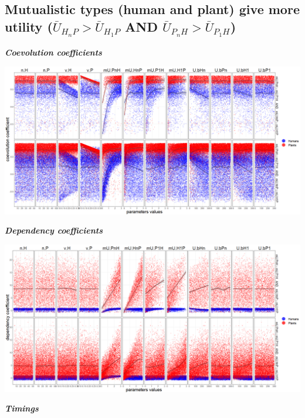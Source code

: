 \documentclass[]{book}
\begin{document}
\hypertarget{mutualistic-types-human-and-plant-give-more-utility-baru_h_np-baru_h_1p-and-baru_p_nh-baru_p_1h}{%
\subsection{\texorpdfstring{Mutualistic types (human and plant) give more utility (\(\bar{U}_{H_{n}P}> \bar{U}_{H_{1}P}\) AND \(\bar{U}_{P_{n}H}> \bar{U}_{P_{1}H}\))}{Mutualistic types (human and plant) give more utility (\textbackslash{}bar\{U\}\_\{H\_\{n\}P\}\textgreater{} \textbackslash{}bar\{U\}\_\{H\_\{1\}P\} AND \textbackslash{}bar\{U\}\_\{P\_\{n\}H\}\textgreater{} \textbackslash{}bar\{U\}\_\{P\_\{1\}H\})}}\label{mutualistic-types-human-and-plant-give-more-utility-baru_h_np-baru_h_1p-and-baru_p_nh-baru_p_1h}}

\textbf{\emph{Coevolution coefficients}}

\includegraphics[width=1\linewidth]{plots/5_multiplePar-coevo-bothImprove-ggplot}

\textbf{\emph{Dependency coefficients}}

\includegraphics[width=1\linewidth]{plots/5_multiplePar-depend-bothImprove-ggplot}

\textbf{\emph{Timings}}
\end{document}
